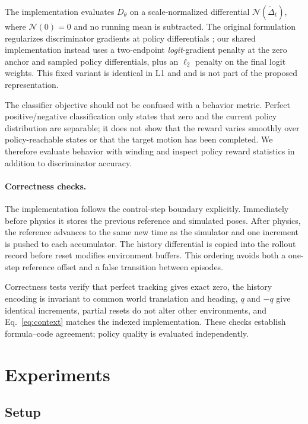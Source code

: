 The implementation evaluates $D_\theta$ on a scale-normalized differential
$\mathcal N(\widetilde\Delta_t)$, where $\mathcal N(0)=0$ and no running mean is
subtracted.  The original formulation regularizes discriminator gradients at
policy differentials \cite{zhang2025add}; our shared implementation instead
uses a two-endpoint \emph{logit}-gradient penalty at the zero anchor and sampled
policy differentials, plus an $\ell_2$ penalty on the final logit weights.  This
fixed variant is identical in L1 and \method{} and is not part of the proposed
representation.

The classifier objective should not be confused with a behavior metric.
Perfect positive/negative classification only states that zero and the current
policy distribution are separable; it does not show that the reward varies
smoothly over policy-reachable states or that the target motion has been
completed.  We therefore evaluate behavior with winding and inspect policy
reward statistics in addition to discriminator accuracy.

\paragraph{Correctness checks.}
The implementation follows the control-step boundary explicitly.  Immediately
before physics it stores the previous reference and simulated poses.  After
physics, the reference advances to the same new time as the simulator and one
increment is pushed to each accumulator.  The history differential is copied
into the rollout record before reset modifies environment buffers.  This
ordering avoids both a one-step reference offset and a false transition between
episodes.

Correctness tests verify that perfect tracking gives exact zero, the history
encoding is invariant to common world translation and heading, $q$ and $-q$
give identical increments, partial resets do not alter other environments,
and Eq.~\eqref{eq:context} matches the indexed implementation.  These checks
establish formula--code agreement; policy quality is evaluated independently.

\section{Experiments}
\label{sec:experiments}

\subsection{Setup}

